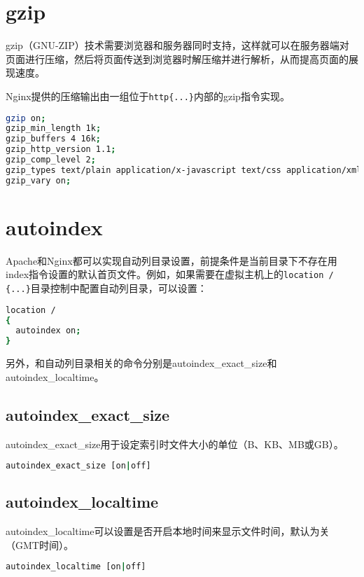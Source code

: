 \section{gzip}


gzip（GNU-ZIP）技术需要浏览器和服务器同时支持，这样就可以在服务器端对页面进行压缩，然后将页面传送到浏览器时解压缩并进行解析，从而提高页面的展现速度。


Nginx提供的压缩输出由一组位于\texttt{http\{...\}}内部的gzip指令实现。


\begin{lstlisting}[language=bash]
gzip on;
gzip_min_length 1k;
gzip_buffers 4 16k;
gzip_http_version 1.1;
gzip_comp_level 2;
gzip_types text/plain application/x-javascript text/css application/xml;
gzip_vary on;
\end{lstlisting}

\section{autoindex}


Apache和Nginx都可以实现自动列目录设置，前提条件是当前目录下不存在用index指令设置的默认首页文件。例如，如果需要在虚拟主机上的\texttt{location / \{...\}}目录控制中配置自动列目录，可以设置：



\begin{lstlisting}[language=bash]
location /
{
  autoindex on;
}
\end{lstlisting}

另外，和自动列目录相关的命令分别是autoindex\_exact\_size和autoindex\_localtime。

\subsection{autoindex\_exact\_size}

autoindex\_exact\_size用于设定索引时文件大小的单位（B、KB、MB或GB）。


\begin{lstlisting}[language=bash]
autoindex_exact_size [on|off]
\end{lstlisting}

\subsection{autoindex\_localtime}

autoindex\_localtime可以设置是否开启本地时间来显示文件时间，默认为关（GMT时间）。

\begin{lstlisting}[language=bash]
autoindex_localtime [on|off]
\end{lstlisting}




